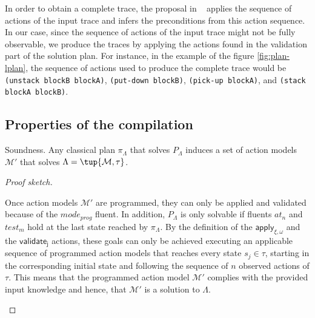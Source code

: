 \textcolor[rgb]{1.00,0.00,0.00}{In order to obtain a complete trace, the proposal in ~\cite{kuvcera2018louga} applies the sequence of actions of the input trace and infers the preconditions from this \FO action sequence}. In our case, since the sequence of actions of the input trace might not be fully observable, we produce the traces by applying the actions found in the validation part of the solution plan. For instance, in the example of the figure \ref{fig:plan-lplan}, the sequence of actions used to produce the complete trace would be {\tt{\small(unstack blockB blockA)}}, {\tt{\small(put-down blockB)}}, {\tt{\small(pick-up blockA)}}, and {\tt{\small(stack blockA blockB)}}.



\subsection{Properties of the compilation}
\label{properties}


\begin{mylemma}
Soundness. Any classical plan $\pi_\Lambda$ that solves $P_{\Lambda}$ induces a set of action models $\mathcal{M}'$ that solves $\Lambda=\tup{\mathcal{M},\tau}$.
\end{mylemma}

\begin{proof}[Proof sketch]
\begin{small}
  Once action models $\mathcal{M}'$ are programmed, they can only be applied and validated because of the $mode_{prog}$ fluent. In addition, $P_{\Lambda}$ is only solvable if fluents {\tt\small $at_n$} and {\tt\small $test_m$} hold at the last state reached by $\pi_\Lambda$. By the definition of the $\mathsf{apply_{\xi,\omega}}$ and the $\mathsf{validate_{j}}$ actions, these goals can only be achieved executing an applicable sequence of programmed action models that reaches every state $s_j\in\tau$, starting in the corresponding initial state and following the sequence of $n$ observed actions of $\tau$. This means that the programmed action model $\mathcal{M}'$ complies with the provided input knowledge and hence, that $\mathcal{M}'$ is a solution to $\Lambda$.
\end{small}
\end{proof}


